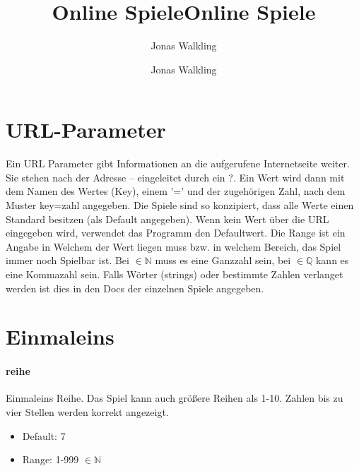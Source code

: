 \documentclass[
  paper=a4,
  ,captions=tableheading
]{scrartcl}
\title{Online Spiele}
\author{Jonas Walkling}
\date{}
\title{Online Spiele}
\author{Jonas Walkling}
\date{}
\providecommand{\tightlist}{%
  \setlength{\itemsep}{0pt}\setlength{\parskip}{0pt}}
\begin{document}




\maketitle
\tableofcontents

\section*{URL-Parameter}

\begin{multicols}{2}


Ein URL Parameter gibt Informationen an die aufgerufene Internetseite weiter. Sie stehen nach der Adresse -- eingeleitet durch ein ?.
Ein Wert wird dann mit dem Namen des Wertes (Key), einem '=' und der zugehörigen Zahl, nach dem Muster key=zahl angegeben. Die Spiele sind so konzipiert, dass alle Werte einen Standard besitzen (als Default angegeben). Wenn kein Wert über die URL eingegeben wird, verwendet das Programm den Defaultwert.
Die Range ist ein Angabe in Welchem der Wert liegen muss bzw. in welchem Bereich, das Spiel immer noch Spielbar ist. Bei $\in \mathbb{N}$ muss es eine Ganzzahl sein, bei $\in \mathbb{Q}$ kann es eine Kommazahl sein. Falls Wörter (strings) oder bestimmte Zahlen verlanget werden ist dies in den Docs der einzelnen Spiele angegeben.

\end{multicols}

\hypertarget{einmaleins}{%
\section{Einmaleins}\label{einmaleins}}

\hypertarget{reihe}{%
\paragraph{reihe}\label{reihe}}

Einmaleins Reihe. Das Spiel kann auch größere Reihen als 1-10. Zahlen
bis zu vier Stellen werden korrekt angezeigt.

\begin{itemize}
\tightlist
\item
  Default: 7
\item
  Range: 1-999 \(\in \mathbb{N}\)
\end{itemize}
\end{document}
